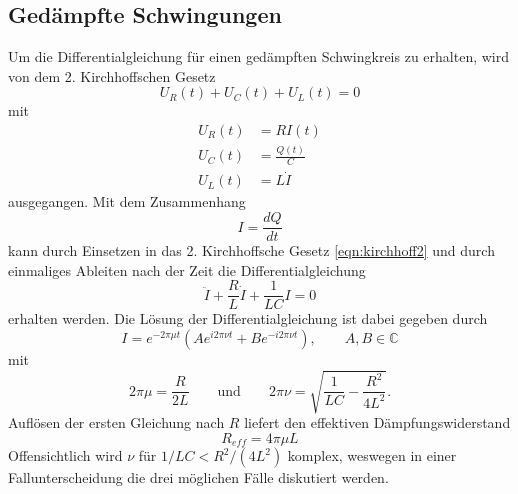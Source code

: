 \subsection{Gedämpfte Schwingungen}
\label{sec:gedämpft}
Um die Differentialgleichung für einen gedämpften Schwingkreis zu erhalten, wird von dem 2. Kirchhoffschen Gesetz
\begin{equation}
    U_R(t)+U_C(t)+U_L(t)=0
    \label{eqn:kirchhoff2}
\end{equation}
mit
\begin{align*}
U_R(t)&=RI(t)                           \\
U_C(t)&=\frac{Q(t)}{C}                  \\
U_L(t)&=L\dot{I}
\end{align*}
ausgegangen. Mit dem Zusammenhang
\begin{equation*}
    I=\frac{dQ}{dt}
\end{equation*}
kann durch Einsetzen in das 2. Kirchhoffsche Gesetz \eqref{eqn:kirchhoff2} und durch einmaliges Ableiten nach der Zeit
die Differentialgleichung
\begin{equation}
    \ddot{I}+\frac{R}{L}\dot{I}+\frac{1}{LC}I=0
    \label{eqn:DGL1}
\end{equation}
erhalten werden. Die Lösung der Differentialgleichung ist dabei gegeben durch
\begin{equation}
    I=e^{-2\pi\mu t}\left(Ae^{i2\pi\nu t}+Be^{-i2\pi\nu t}\right), \qquad A,B\in\mathbb{C}
    \label{eqn:Losung1}
\end{equation}
mit
\begin{equation*}
    2\pi \mu=\frac{R}{2L}
    \qquad\text{und}\qquad
    2\pi \nu=\sqrt{\frac{1}{LC}-\frac{R^2}{4L^2}} .
\end{equation*}
Auflösen der ersten Gleichung nach $R$ liefert den effektiven Dämpfungswiderstand
\begin{equation}
    R_{eff}=4\pi\mu L
    \label{eqn:Reff}
\end{equation}
Offensichtlich wird $\nu$ für $1/LC<R^2/(4L^2)$ komplex, weswegen in einer Fallunterscheidung die drei möglichen Fälle
diskutiert werden.

